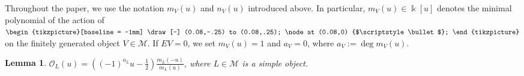 \documentclass[a4,10pt]{amsart}
\numberwithin{equation}{section}
\def\deg{\operatorname{deg}}
\newtheorem{Lemma}[Theorem]{Lemma}
\theoremstyle{definition}
\begin{document}
Throughout the paper, we use  the notation $m_V(u)$ and $n_V(u)$ introduced  above. In particular,  $m_V(u)\in \Bbbk[u]$ denotes    the minimal polynomial of the action of  $ \begin{tikzpicture}[baseline = -1mm]
	\draw[-] (0.08,-.25) to (0.08,.25);
      \node at (0.08,0) {$\scriptstyle\bullet$};
\end{tikzpicture}$   on the finitely generated object $V\in \mathcal M$.
 If   $EV=0$, we set $m_V(u)=1$ and $a_V=0$, where  $a_V:=\deg m_V(u)$.


\begin{Lemma}  \label{u-admiss}  
 $\mathcal O_L(u)=   ((-1)^{a_L}u-\frac{1}{2}) \frac{m_L(-u)}{m_L(u)} $, where  $L\in \mathcal M$ is a  simple object. \end{Lemma}
\end{document}
